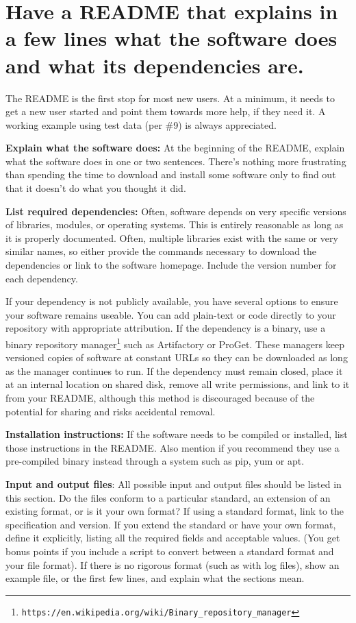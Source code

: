 \documentclass[10pt,letterpaper]{article}
\newcommand{\withurl}[2]{{#1}\footnote{\texttt{#2}}}
\begin{document}
\section{Have a README that explains in a few lines what the software does and what its dependencies are.}

The README is the first stop for most new users.
At a minimum, it needs to get a new user started and point them towards more
help, if they need it.
A working example using test data (per
\#9) is always appreciated.

\textbf{Explain what the software does:} At the beginning of the README,
explain what the software does in one or two sentences.
There's nothing more frustrating
than spending the time to download and install some software only to
find out that it doesn't do what you thought it did.

\textbf{List required dependencies:} Often, software depends on very
specific versions of libraries, modules, or operating systems. This is
entirely reasonable as long as it is properly documented. Often,
multiple libraries exist with the same or very similar names, so
either provide the commands necessary to download the dependencies or
link to the software homepage. Include the version number for each
dependency.  

If your dependency is not publicly available,
you have several options to ensure your software remains useable.
You can add plain-text or code directly to
your repository with appropriate attribution. If the dependency is a binary, use a
\withurl{binary repository manager}{https://en.wikipedia.org/wiki/Binary\_repository\_manager}
such as Artifactory or ProGet. These managers keep versioned copies of
software at constant URLs so they can be downloaded as long as the
manager continues to run. If the dependency must remain closed, place it at an
internal location on shared disk, remove all write permissions, and
link to it from your README, although this method is 
discouraged because of the potential for sharing and risks accidental removal.

\textbf{Installation instructions:} If the software needs to be compiled
or installed, list those instructions in the README. Also
mention if you recommend they use a pre-compiled binary instead
through a system such as pip, yum or apt.

\textbf{Input and output files}: All possible input and output files
should be listed in this section. Do the files conform to a particular
standard, an extension of an existing format, or is it your own
format? If using a standard format, link to the specification and
version. If you extend the standard or have your own format, define it
explicitly, listing all the required fields and acceptable values.
(You get bonus points if you include a script to convert between
a standard format and your file format). If there is no rigorous format
(such as with log files), show an example file, or the first few lines,
and explain what the sections mean.
\end{document}
